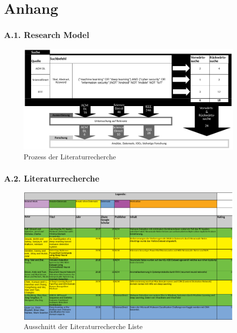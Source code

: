 \documentclass[
    12pt, %
    DIV10,
    ngerman, %
    a4paper, %
    oneside, %
    titlepage, %
    parskip=half, %
    headings=normal, %
    listof=totoc, %
    bibliography=totoc, %
    index=totoc, %
    captions=tableheading, %
    final %
]{scrreprt}
\begin{document}
\chapter{Anhang}
\subsection*{A.1. Research Model}\label{rm}

\begin{figure}[h!]
\hspace{-2.3cm}
\includegraphics[width=1.3\textwidth]{img/rm}
\caption*{Prozess der Literaturrecherche}
\end{figure}
\newpage
\subsection*{A.2. Literaturrecherche}\label{literaturr}

\begin{figure}[h!]
\hspace{-2.2cm}
\includegraphics[width=1.3\textwidth]{img/literaturr}
\caption*{Ausschnitt der Literaturrecherche Liste}
\end{figure}
\newpage
\end{document}
